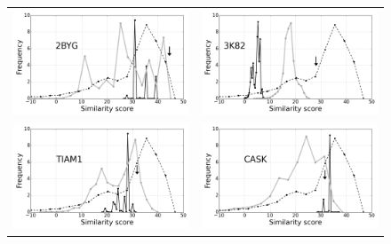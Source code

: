 \documentclass[a4paper,12pt]{article}
\begin{document}
\begin{figure}[t]
\begin{tabular}{cc}
       \includegraphics[width=8.4cm]{rapport/resultats/PDZ/graphe/optGrad0/RP55/2BYG_core_simil.png} &
       \includegraphics[width=8.4cm]{rapport/resultats/PDZ/graphe/optGrad0/RP55/3K82_core_simil.png} \\
       \includegraphics[width=8.4cm]{rapport/resultats/PDZ/graphe/optGrad0/RP55/TIAM1_core_simil.png} &
       \includegraphics[width=8.4cm]{rapport/resultats/PDZ/graphe/optGrad0/RP55/CASK_core_simil.png} \\ 
     \end{tabular}
\label{graph:Simil_Proteus_PDZ}
   \end{figure}
\thispagestyle{empty}
\end{document}
